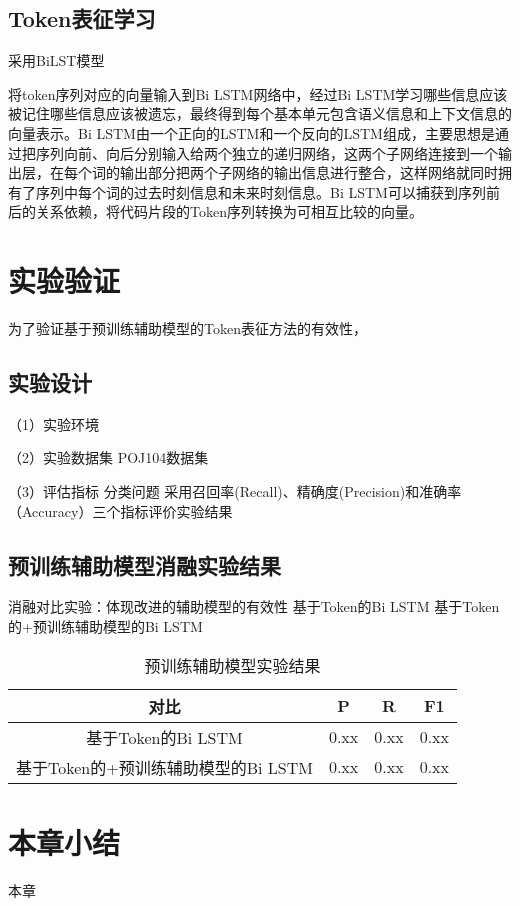 \subsection{Token表征学习}
采用BiLST模型

将token序列对应的向量输入到Bi LSTM网络中，经过Bi LSTM学习哪些信息应该被记住哪些信息应该被遗忘，最终得到每个基本单元包含语义信息和上下文信息的向量表示。Bi LSTM由一个正向的LSTM和一个反向的LSTM组成，主要思想是通过把序列向前、向后分别输入给两个独立的递归网络，这两个子网络连接到一个输出层，在每个词的输出部分把两个子网络的输出信息进行整合，这样网络就同时拥有了序列中每个词的过去时刻信息和未来时刻信息。Bi LSTM可以捕获到序列前后的关系依赖，将代码片段的Token序列转换为可相互比较的向量。
\section{实验验证}
为了验证基于预训练辅助模型的Token表征方法的有效性，

\subsection{实验设计}
（1）实验环境

（2）实验数据集
POJ104数据集

（3）评估指标
分类问题 采用召回率(Recall)、精确度(Precision)和准确率（Accuracy）三个指标评价实验结果

\subsection{预训练辅助模型消融实验结果}
消融对比实验：体现改进的辅助模型的有效性
基于Token的Bi LSTM
基于Token的+预训练辅助模型的Bi LSTM


\begin{table}
  \centering
  \caption{预训练辅助模型实验结果} %
  \begin{tabular*}{0.9\textwidth}{@{\extracolsep{\fill}}cccc}
  \toprule
    对比			&P		&R		&F1 \\
  \midrule
    基于Token的Bi LSTM			&0.xx	&0.xx		&0.xx \\
    基于Token的+预训练辅助模型的Bi LSTM			&0.xx		&0.xx		&0.xx \\
  \bottomrule
  \end{tabular*}
\end{table}

\section{本章小结}
本章




